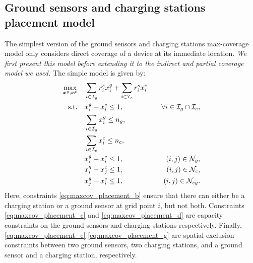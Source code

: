 \documentclass{article}
\newcommand{\set}[1]{\mathcal{#1}}
\begin{document}
\subsection{Ground sensors and charging stations placement model}\label{appendix:max coverage ground}
The simplest version of the ground sensors and charging stations max-coverage model only considers direct coverage of a device at its immediate location. \textit{We first present this model before extending it to the indirect and partial coverage model we used.} The simple model is given by:
\allowdisplaybreaks
\begin{subequations}\label{eq:maxcov_placement}
    \begin{align} 
        \max_{\bm x^g, \bm x^c} &\quad \displaystyle \sum_{i \in \set I_g} r_i^s x_i^g + \sum_{i \in \set I_c} r_i^s x_i^c \label{eq:maxcov_placement_a} \\
        {\rm s.t. } &\quad \displaystyle x_i^g + x_i^c \leq 1, &\quad \forall i \in \set I_g \cap \set I_c, \label{eq:maxcov_placement_b} \\
        &\quad \displaystyle \sum_{i \in \set I_g} x_i^g \leq n_g, \label{eq:maxcov_placement_c} \\
        &\quad \displaystyle \sum_{i \in \set I_c} x_i^c \leq n_c, \label{eq:maxcov_placement_d} \\
        &\quad \displaystyle x_i^g + x_i^c \leq 1, &\quad (i,j) \in \set N_g, \label{eq:maxcov_placement_e} \\
        &\quad \displaystyle x_i^g + x_j^c \leq 1, &\quad (i,j) \in \set N_c, \label{eq:maxcov_placement_f} \\
        &\quad \displaystyle x_j^g + x_i^c \leq 1, &\quad (i,j) \in \set N_{cg}.\label{eq:maxcov_placement_g} 
    \end{align}
\end{subequations}
Here, constraints \eqref{eq:maxcov_placement_b} ensure that there can either be a charging station or a ground sensor at grid point $i$, but not both. Constraints \eqref{eq:maxcov_placement_c} and \eqref{eq:maxcov_placement_d} are capacity constraints on the ground sensors and charging stations respectively. Finally, \eqref{eq:maxcov_placement_e}-\eqref{eq:maxcov_placement_g} are spatial exclusion constraints between two ground sensors, two charging stations, and a ground sensor and a charging station, respectively.
\end{document}
